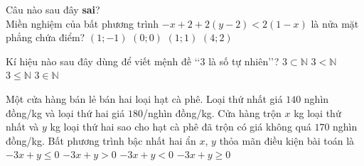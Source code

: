 \begin{ex}%
	Câu nào sau đây \textbf{sai}?\\
	Miền nghiệm của bất phương trình $-x+2+2(y-2) < 2(1-x)$ là nửa mặt phẳng chứa điểm?
	\choice
	{$(1;-1)$}
	{$(0; 0)$}
	{$(1; 1)$}
	{\True $(4; 2)$}
\end{ex}
	
\begin{ex}%
	Kí hiệu nào sau đây dùng để viết mệnh đề \lq\lq$3$ là số tự nhiên\rq\rq?
	\choice
	{$3 \subset \mathbb{N}$}
	{$3 < \mathbb{N}$}
	{$3 \leq \mathbb{N}$}
	{\True $3 \in \mathbb{N}$}
\end{ex}
	
\begin{ex}%
	Một cửa hàng bán lẻ bán hai loại hạt cà phê. Loại thứ nhất giá $140$ nghìn đồng/kg và loại thứ hai giá $180$/nghìn đồng/kg. Cửa hàng trộn $x$ kg loại thứ nhất và $y$ kg loại thứ hai sao cho hạt cà phê đã trộn có giá không quá $170$ nghìn đồng/kg. Bất phương trình bậc nhất hai ẩn $x$, $y$ thỏa mãn điều kiện bài toán là
	\choice
	{\True $-3 x+y \le 0$}
	{$-3 x+y > 0$}
	{$-3 x+y < 0$}
	{$-3 x+y \ge 0$}
\end{ex}
	

